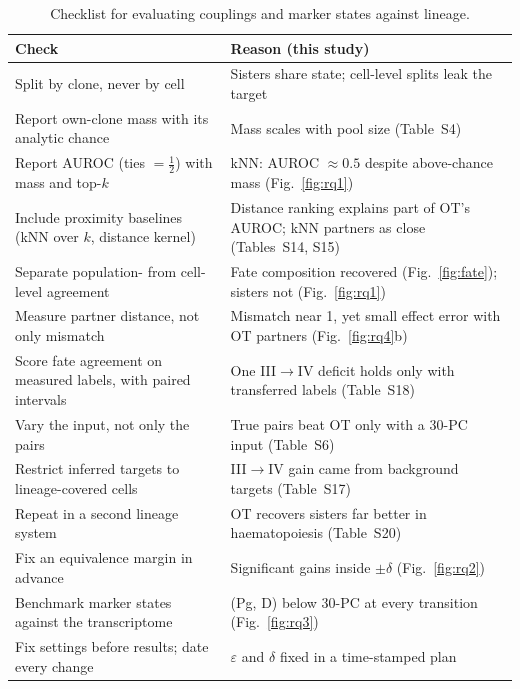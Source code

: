 \documentclass[10pt,journal,compsoc]{IEEEtran}
\begin{document}
\begin{table}[!t]
\centering
\caption{Checklist for evaluating couplings and marker states against lineage.}
\label{tab:checklist}
\footnotesize
\renewcommand{\arraystretch}{1.15}
\begin{tabular}{@{}>{\raggedright\arraybackslash}p{}>{\raggedright\arraybackslash}p{}@{}}
\toprule
Check & Reason (this study) \\
\midrule
Split by clone, never by cell & Sisters share state; cell-level splits leak the target \\
Report own-clone mass with its analytic chance & Mass scales with pool size (Table~S4) \\
Report AUROC (ties $=\frac12$) with mass and top-$k$ & kNN: AUROC $\approx 0.5$ despite above-chance mass (Fig.~\ref{fig:rq1}) \\
Include proximity baselines (kNN over $k$, distance kernel) & Distance ranking explains part of OT's AUROC; kNN partners as close (Tables~S14, S15) \\
Separate population- from cell-level agreement & Fate composition recovered (Fig.~\ref{fig:fate}); sisters not (Fig.~\ref{fig:rq1}) \\
Measure partner distance, not only mismatch & Mismatch near 1, yet small effect error with OT partners (Fig.~\ref{fig:rq4}b) \\
Score fate agreement on measured labels, with paired intervals & One III$\to$IV deficit holds only with transferred labels (Table~S18) \\
Vary the input, not only the pairs & True pairs beat OT only with a 30-PC input (Table~S6) \\
Restrict inferred targets to lineage-covered cells & III$\to$IV gain came from background targets (Table~S17) \\
Repeat in a second lineage system & OT recovers sisters far better in haematopoiesis (Table~S20) \\
Fix an equivalence margin in advance & Significant gains inside $\pm\delta$ (Fig.~\ref{fig:rq2}) \\
Benchmark marker states against the transcriptome & (Pg, D) below 30-PC at every transition (Fig.~\ref{fig:rq3}) \\
Fix settings before results; date every change & $\varepsilon$ and $\delta$ fixed in a time-stamped plan \\
\bottomrule
\end{tabular}
\end{table}
\end{document}
